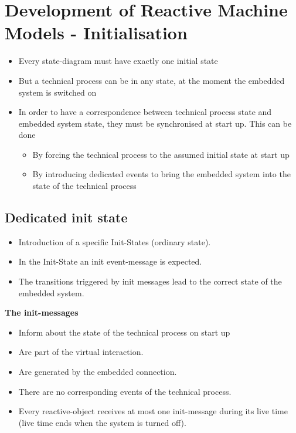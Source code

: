 \hypertarget{development-of-reactive-machine-models---initialisation}{%
\section{Development of Reactive Machine Models -
Initialisation}\label{development-of-reactive-machine-models---initialisation}}

\begin{itemize}
\tightlist
\item
  Every state-diagram must have exactly one initial state
\item
  But a technical process can be in any state, at the moment the
  embedded system is switched on
\item
  In order to have a correspondence between technical process state and
  embedded system state, they must be synchronised at start up. This can
  be done

  \begin{itemize}
  \tightlist
  \item
    By forcing the technical process to the assumed initial state at
    start up
  \item
    By introducing dedicated events to bring the embedded system into
    the state of the technical process
  \end{itemize}
\end{itemize}

\hypertarget{dedicated-init-state}{%
\subsection{Dedicated init state}\label{dedicated-init-state}}

\begin{itemize}
\tightlist
\item
  Introduction of a specific Init-States (ordinary state).
\item
  In the Init-State an init event-message is expected.
\item
  The transitions triggered by init messages lead to the correct state
  of the embedded system.
\end{itemize}

\textbf{The init-messages}

\begin{itemize}
\tightlist
\item
  Inform about the state of the technical process on start up
\item
  Are part of the virtual interaction.
\item
  Are generated by the embedded connection.
\item
  There are no corresponding events of the technical process.
\item
  Every reactive-object receives at most one init-message during its
  live time (live time ends when the system is turned off).
\end{itemize}

